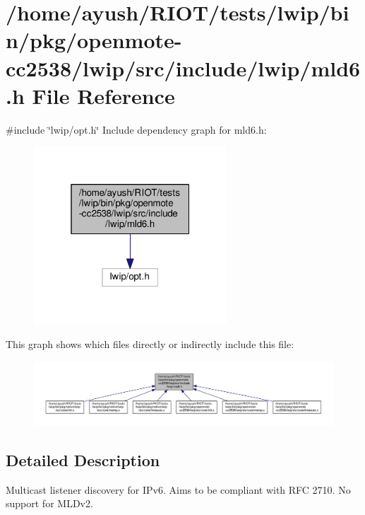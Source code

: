 \hypertarget{openmote-cc2538_2lwip_2src_2include_2lwip_2mld6_8h}{}\section{/home/ayush/\+R\+I\+O\+T/tests/lwip/bin/pkg/openmote-\/cc2538/lwip/src/include/lwip/mld6.h File Reference}
\label{openmote-cc2538_2lwip_2src_2include_2lwip_2mld6_8h}
{\ttfamily \#include \char`\"{}lwip/opt.\+h\char`\"{}}\newline
Include dependency graph for mld6.\+h\+:
\nopagebreak
\begin{figure}[H]
\begin{center}
\leavevmode
\includegraphics[width=205pt]{openmote-cc2538_2lwip_2src_2include_2lwip_2mld6_8h__incl}
\end{center}
\end{figure}
This graph shows which files directly or indirectly include this file\+:
\nopagebreak
\begin{figure}[H]
\begin{center}
\leavevmode
\includegraphics[width=350pt]{openmote-cc2538_2lwip_2src_2include_2lwip_2mld6_8h__dep__incl}
\end{center}
\end{figure}


\subsection{Detailed Description}
Multicast listener discovery for I\+Pv6. Aims to be compliant with R\+FC 2710. No support for M\+L\+Dv2. 